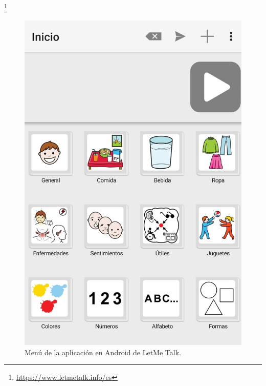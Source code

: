 \footnote{\url{ https://www.letmetalk.info/es}}
\begin{figure}[h!]
	\centering
	\includegraphics[width=0.7\linewidth]{Imagenes/Bitmap/LetMeTalk}
	\caption{Menú de la aplicación en Android de LetMe Talk.}
	\label{fig:letmetalk}
\end{figure}

\newpage


